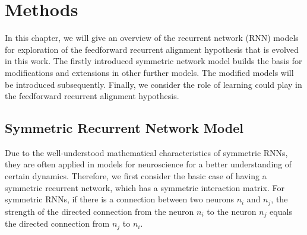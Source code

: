 \documentclass[11pt]{article}
\begin{document}
	
	\section{Methods}
	In this chapter, we will give an overview of the recurrent network (RNN) models for exploration of the feedforward recurrent alignment hypothesis that is evolved in this work. The firstly introduced symmetric network model builds the basis for modifications and extensions in other further models. The modified models will be introduced subsequently. Finally, we consider the role of learning could play in the feedforward recurrent alignment hypothesis. 
	
	\subsection{Symmetric Recurrent Network Model}
	Due to the well-understood mathematical characteristics of symmetric RNNs, they are often applied in models for neuroscience for a better understanding of certain dynamics.  
	Therefore, we first consider the basic case of having a symmetric recurrent network, which has a symmetric interaction matrix. For symmetric RNNs, if there is a connection between two neurons $n_i$ and $n_j$, the strength of the directed connection from the neuron $n_i$ to the neuron $n_j$ equals the directed connection from $n_j$ to $n_i$. 
\end{document}
